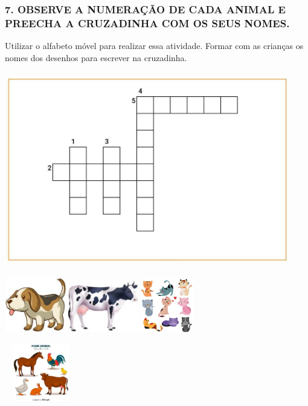 \subsubsection{7. OBSERVE A NUMERAÇÃO DE CADA ANIMAL E PREECHA A
CRUZADINHA COM OS SEUS NOMES.}\label{observe-a-numerauxe7uxe3o-de-cada-animal-e-preecha-a-cruzadinha-com-os-seus-nomes.}

Utilizar o alfabeto móvel para realizar essa atividade. Formar com as
crianças os nomes dos desenhos para escrever na cruzadinha.

\includegraphics[width=4.90625in,height=3.34375in]{media/image90.jpg}

\includegraphics[width=1.06250in,height=0.94306in]{media/image91.jpg}\includegraphics[width=1.24583in,height=0.90625in]{media/image92.jpg}\includegraphics[width=0.97639in,height=0.92708in]{media/image93.jpg}

\includegraphics[width=1.25000in,height=0.99097in]{media/image94.jpg}

